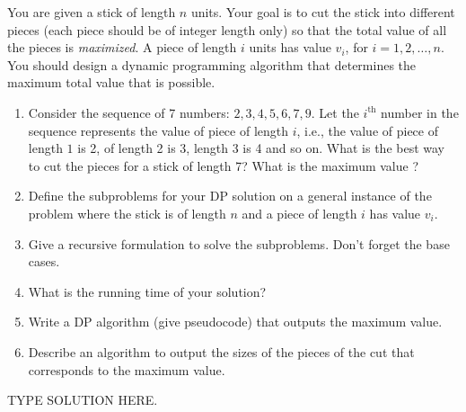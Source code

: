 \documentclass[draft]{article}
\begin{document}
\begin{exercise}{6.20}

    You are given a stick of length $n$ units. Your goal is to cut the stick into different pieces (each piece should be of integer length only) so that the total value of all the pieces is \emph{maximized}. A piece of length $i$ units has value $v_i$, for $i = 1, 2, \dots, n$. You should design a dynamic programming algorithm that determines the maximum total value that is possible.
    \begin{enumerate}[label=(\roman*)]
        \item Consider the sequence of 7 numbers: $2,3,4,5,6,7,9$. Let the $i^{\text{th}}$ number in the sequence represents the value of piece of length $i$, i.e., the value of piece of length $1$ is 2, of length 2 is 3, length 3 is 4 and so on. What is the best way to cut the pieces for a stick of length 7? What is the maximum value ?
        \item Define the subproblems for your DP solution on a general instance of the problem where the stick is of length $n$ and a piece of length $i$ has value $v_i$.
        \item Give a recursive formulation to solve the subproblems. Don't forget the base cases.
        \item What is the running time of your solution?
        \item Write a DP algorithm (give pseudocode) that outputs the maximum value.
        \item Describe an algorithm to output the sizes of the pieces of the cut that corresponds to the maximum value.
    \end{enumerate}
\end{exercise}

\begin{solution}
    TYPE SOLUTION HERE.
\end{solution}
\end{document}
